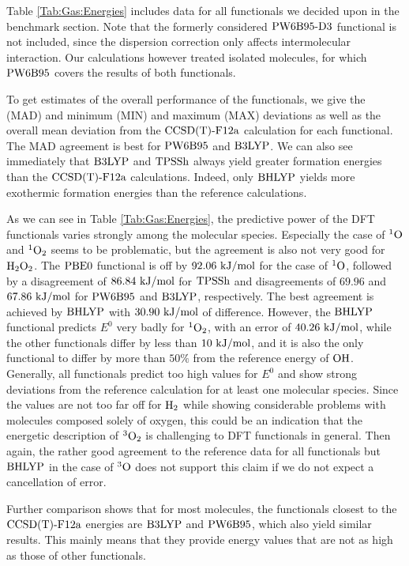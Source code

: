 \documentclass[8.5pt,twoside,twocolumn]{article}
\newcommand\singo{\enmat{{^1\te{O}}}}
\newcommand\tripo{\enmat{{^3\te{O}}}}
\newcommand\singot{\enmat{{^1\ot}}}
\newcommand\tripot{\enmat{{^3\ot}}}
\newcommand\kmo{\enmat{\te {kJ/mol}}}
\theoremstyle{standard}
\begin{document}
Table \ref{Tab:Gas:Energies} includes data for all functionals we decided upon
in the benchmark section. Note that the formerly considered $\text{PW6B95}\text{-D3}$ functional
is not included, since the dispersion correction only affects intermolecular
interaction. Our calculations however treated isolated molecules, for which
$\text{PW6B95}$ covers the results of both functionals.

To get estimates of the overall performance of the functionals,
we give the  (MAD) and minimum (MIN)
and maximum (MAX) deviations as well as the overall mean deviation
from the $\text{CCSD(T)-F12a}$ calculation for each functional. The MAD agreement is
best for $\text{PW6B95}$ and $\text{B3LYP}$. We can also see immediately
that $\text{B3LYP}$ and $\text{TPSSh}$ always yield greater formation energies
than the $\text{CCSD(T)-F12a}$ calculations. Indeed, only $\text{BHLYP}$ yields 
more exothermic formation energies than the reference calculations.

As we can see in Table \ref{Tab:Gas:Energies}, the predictive power
of the DFT functionals varies strongly among the molecular species.
Especially the case of $\singo$ and $\singot$ seems to be problematic, but
the agreement is also not very good for $\text H _2 \text O_2$. The $\text{PBE0}$ functional
is off by $92.06~\kmo$ for the case of $\singo$, followed
by a disagreement of $86.84~\kmo$ for $\text{TPSSh}$ and disagreements
of $69.96$ and $67.86~\kmo$ for $\text{PW6B95}$ and $\text{B3LYP}$, respectively.
The best agreement is achieved by $\text{BHLYP}$ with $30.90~\kmo$ of
difference. However, the $\text{BHLYP}$ functional predicts 
$E^0$ very badly for $\singot$, with an error of $40.26~\kmo$,
while the other functionals differ by less than $10~\kmo$, and it is also
the only functional to differ by more than $50\%$ from the reference energy
of $\text O \text H$. Generally, all functionals predict too high values for $E^0$
and show strong deviations from the reference calculation for at least one
molecular species.
Since the values are not too far off for $\text H_2$ while showing
considerable problems with molecules composed solely of oxygen,
this could be an indication that the energetic description of $\tripot$
is challenging to DFT functionals in general. Then again, the rather good
agreement to the reference data for all functionals but $\text{BHLYP}$ in the case
of $\tripo$ does not support this claim if we do not expect
a cancellation of error. 

Further comparison shows that for most molecules, the functionals
closest to the $\text{CCSD(T)-F12a}$ energies are $\text{B3LYP}$ and $\text{PW6B95}$, which
also yield similar results. This mainly means that they provide
energy values that are not as high as those of other functionals. 
\end{document}
